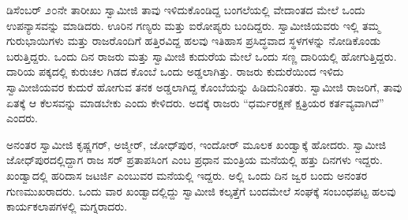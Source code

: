  ಡಿಸೆಂಬರ್ ೨೦ನೇ ತಾರೀಖು ಸ್ವಾಮೀಜಿ ತಾವು ಇಳಿದುಕೊಂಡಿದ್ದ ಬಂಗಲೆಯಲ್ಲಿ ವೇದಾಂತದ ಮೇಲೆ ಒಂದು ಉಪನ್ಯಾಸವನ್ನು ಮಾಡಿದರು. ಊರಿನ ಗಣ್ಯರು ಮತ್ತು ಐರೋಪ್ಯರು ಬಂದಿದ್ದರು. ಸ್ವಾಮೀಜಿಯವರು ಇಲ್ಲಿ ತಮ್ಮ ಗುರುಭಾಯಿಗಳು ಮತ್ತು ರಾಜರೊಂದಿಗೆ ಹತ್ತಿರವಿದ್ದ ಹಲವು ಇತಿಹಾಸ ಪ್ರಸಿದ್ಧವಾದ ಸ್ಥಳಗಳನ್ನು ನೋಡಿಕೊಂಡು ಬರುತ್ತಿದ್ದರು. ಒಂದು ದಿನ ರಾಜರು ಮತ್ತು ಸ್ವಾಮೀಜಿ ಕುದುರೆಯ ಮೇಲೆ ಒಂದು ಸಣ್ಣ ದಾರಿಯಲ್ಲಿ ಹೋಗುತ್ತಿದ್ದರು. ದಾರಿಯ ಪಕ್ಕದಲ್ಲಿ ಕುರುಚಲ ಗಿಡದ ಕೊಂಬೆ ಒಂದು ಅಡ್ಡಲಾಗಿತ್ತು. ರಾಜರು ಕುದುರೆಯಿಂದ ಇಳಿದು ಸ್ವಾಮೀಜಿಯವರ ಕುದುರೆ ಹೋಗುವ ತನಕ ಅಡ್ಡಲಾಗಿದ್ದ ಕೊಂಬೆಯನ್ನು ಹಿಡಿದುನಿಂತರು. ಸ್ವಾಮೀಜಿ ರಾಜರಿಗೆ, ತಾವು ಏತಕ್ಕೆ ಆ ಕೆಲಸವನ್ನು ಮಾಡಬೇಕು ಎಂದು ಕೇಳಿದರು. ಅದಕ್ಕೆ ರಾಜರು “ಧರ್ಮರಕ್ಷಣೆ ಕ್ಷತ್ರಿಯರ ಕರ್ತವ್ಯವಾಗಿದೆ” ಎಂದರು. 

\vskip 2pt

 ಅನಂತರ ಸ್ವಾಮೀಜಿ ಕೃಷ್ಣಗರ್, ಅಜ್ಮೀರ್, ಜೋಧ್‍ಪುರ, ಇಂದೋರ್ ಮೂಲಕ ಖಂಡ್ವಾಕ್ಕೆ ಹೋದರು. ಸ್ವಾಮೀಜಿ ಜೋಧ್‍ಪುರದಲ್ಲಿದ್ದಾಗ ರಾಜ ಸರ್ ಪ್ರತಾಪಸಿಂಗ ಎಂಬ ಪ್ರಧಾನ ಮಂತ್ರಿಯ ಮನೆಯಲ್ಲಿ ಹತ್ತು ದಿನಗಳು ಇದ್ದರು. ಖಂಡ್ವಾದಲ್ಲಿ ಹರಿದಾಸ ಜಟರ್ಜಿ ಎಂಬುವರ ಮನೆಯಲ್ಲಿ ಇದ್ದರು. ಅಲ್ಲಿ ಒಂದು ದಿನ ಜ್ವರ ಬಂದು ಅನಂತರ ಗುಣಮುಖರಾದರು. ಒಂದು ವಾರ ಖಂಡ್ವಾದಲ್ಲಿದ್ದು ಸ್ವಾಮೀಜಿ ಕಲ್ಕತ್ತೆಗೆ ಬಂದಮೇಲೆ ಸಂಘಕ್ಕೆ ಸಂಬಂಧಪಟ್ಟ ಹಲವು ಕಾರ್ಯಕಲಾಪಗಳಲ್ಲಿ ಮಗ್ನರಾದರು. 

